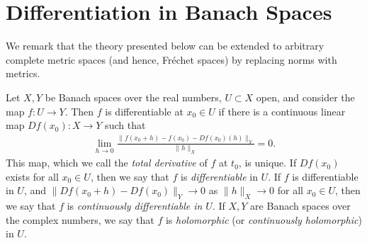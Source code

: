 \section{Differentiation in Banach Spaces}
We remark that the theory presented below can be extended to arbitrary complete
metric spaces (and hence, Fr\'echet spaces) by replacing norms with metrics.
\begin{definition}
	\label{def:diff}
	Let $X,Y$ be Banach spaces over the real numbers, $U \subset X$ open,
  and consider the map $f: U \to Y$.
	Then $f$ is differentiable at $x_0 \in U$ if there
	is a continuous linear map $Df(x_0): X \to Y$ such that
	\begin{equation}
		\label{diff-limit}
		\begin{split}
			\lim_{h \to 0} \frac{\|f(x_0+ h) - f(x_0) -
			Df(x_0)(h) \|_Y}{\|h\|_{X}} = 0.
		\end{split}
	\end{equation}
	This map, which we call the \emph{total derivative} of $f$ at $t_0$, is 
	unique. If $Df(x_0)$ exists for all $x_0 \in U$,
	then we say that $f$ is
	\emph{differentiable} in $U$. If $f$ is differentiable in $U$, and 
	$\|Df(x_0 + h) - Df(x_0) \|_Y \to 0$ as $\|h\|_{X} \to 0$ for all $x_0 \in U$,
	then we say that $f$ is \emph{continuously differentiable in $U$}. If $X, Y$
  are Banach spaces over the complex numbers, we say that $f$ is
  \emph{holomorphic} (or \emph{continuously holomorphic}) in $U$.
\end{definition}
